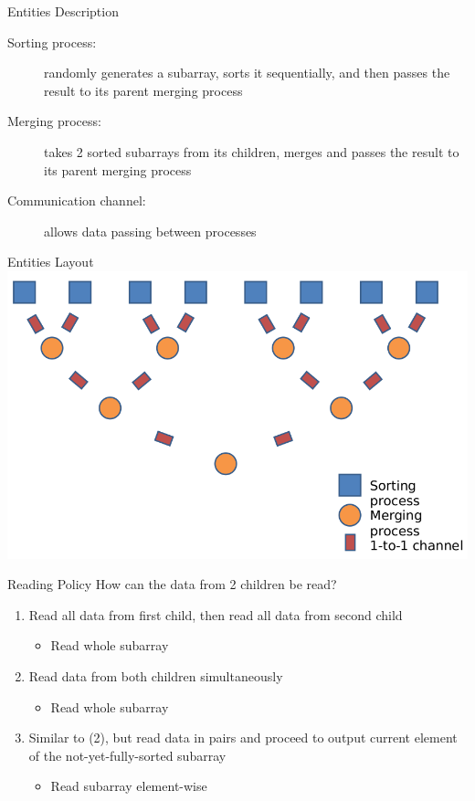 \begin{frame}{Entities Description}
  \begin{description}
  \item[Sorting process:] randomly generates a subarray, sorts it
    sequentially, and then passes the result to its parent merging
    process
  \item[Merging process:] takes 2 sorted subarrays from its children,
    merges and passes the result to its parent merging process
  \item[Communication channel:] allows data passing between processes
  \end{description}
\end{frame}

\begin{frame}{Entities Layout}
  \includegraphics[width=\textwidth]{figures/mergesort}
\end{frame}

\begin{frame}{Reading Policy}
  How can the data from 2 children be read?


  \begin{enumerate}
  \item Read all data from first child, then read all data from second
    child
   \begin{itemize}
   \item Read whole subarray
   \end{itemize}
 \item Read data from both children simultaneously
   \begin{itemize}
   \item Read whole subarray
   \end{itemize}
 \item Similar to (2), but read data in pairs and proceed to output
   current element of the not-yet-fully-sorted subarray
   \begin{itemize}
   \item Read subarray element-wise
   \end{itemize}

  \end{enumerate}
\end{frame}

